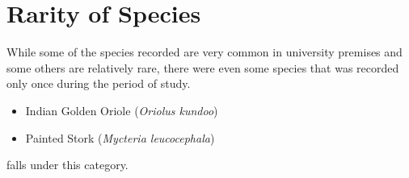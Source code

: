 \section{Rarity of Species}
While some of the species recorded are very common in university premises and some others are relatively rare, there were even some species that was recorded only once during the period of study.
\begin{itemize}
    \item Indian Golden Oriole (\textit{Oriolus kundoo})
    \item Painted Stork (\textit{Mycteria leucocephala})
\end{itemize}
falls under this category.
